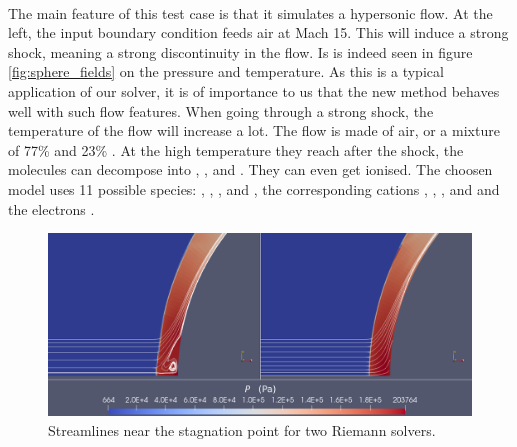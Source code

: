         \paragraph{}
        The main feature of this test case is that it simulates a hypersonic flow.
        At the left, the input boundary condition feeds air at Mach 15.
        This will induce a strong shock, meaning a strong discontinuity in the flow.
        Is is indeed seen in figure \ref{fig:sphere_fields} on the pressure and temperature.
        As this is a typical application of our solver, it is of importance to us that the new method behaves well with such flow features.
        When going through a strong shock, the temperature of the flow will increase a lot.
        The flow is made of air, or a mixture of 77\%  and 23\% .
        At the high temperature they reach after the shock, the molecules can decompose into , , and .
        They can even get ionised.
        The choosen model uses 11 possible species: , , ,  and , the corresponding cations , , ,  and  and the electrons .

        \begin{figure}
          \centering
          \includegraphics[width=\textwidth]{figures/sphere_carbuncle.png}
          \caption{Streamlines near the stagnation point for two Riemann solvers.}
          \label{fig:sphere_carbuncle}
        \end{figure}

